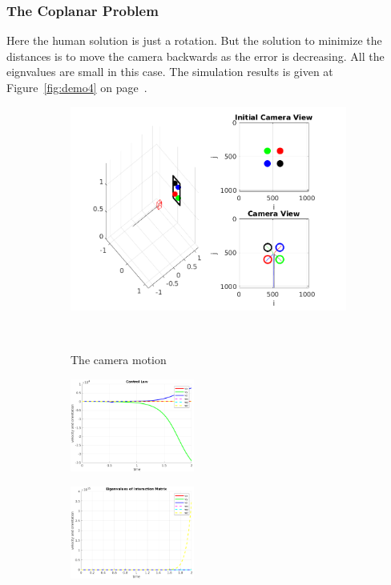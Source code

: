 \documentclass[a4paper,12pt]{article}
\begin{document}
\subsubsection{The Coplanar Problem}
Here the human solution is just a rotation. But the solution to minimize the distances is to move the camera 
backwards as the error is decreasing. All the eignvalues are small in this case. The simulation results is given at Figure~\ref{fig:demo4} on page~\pageref{fig:demo4}.
\begin{figure}[t!]
		 \begin{subfigure}[b]{\textwidth}         
         	\centering
	         \includegraphics[width=13cm]{../results/Demo4-simulation.png}
    	     \caption{The camera motion}
    	     \vspace~
		 \end{subfigure}
         \begin{subfigure}[b]{0.32\textwidth}
        	\centering
	        \includegraphics[height=1.2in]{../results/Demo4-control-law.png}
		 \end{subfigure}
         \begin{subfigure}[b]{0.2\textwidth}
        	\centering
	        \includegraphics[height=1.2in]{../results/Demo4-eignen.png}

\end{subfigure}
\end{figure}
\end{document}
